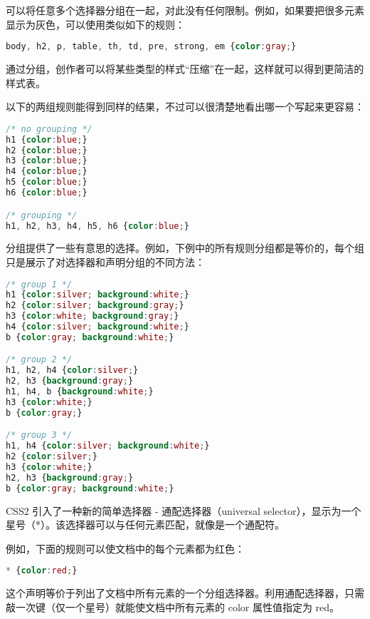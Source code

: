 可以将任意多个选择器分组在一起，对此没有任何限制。例如，如果要把很多元素显示为灰色，可以使用类似如下的规则：

\begin{lstlisting}[language=CSS]
body, h2, p, table, th, td, pre, strong, em {color:gray;}
\end{lstlisting}



通过分组，创作者可以将某些类型的样式“压缩”在一起，这样就可以得到更简洁的样式表。


以下的两组规则能得到同样的结果，不过可以很清楚地看出哪一个写起来更容易：


\begin{lstlisting}[language=CSS]
/* no grouping */
h1 {color:blue;}
h2 {color:blue;}
h3 {color:blue;}
h4 {color:blue;}
h5 {color:blue;}
h6 {color:blue;}

/* grouping */
h1, h2, h3, h4, h5, h6 {color:blue;}
\end{lstlisting}




分组提供了一些有意思的选择。例如，下例中的所有规则分组都是等价的，每个组只是展示了对选择器和声明分组的不同方法：


\begin{lstlisting}[language=CSS]
/* group 1 */
h1 {color:silver; background:white;}
h2 {color:silver; background:gray;}
h3 {color:white; background:gray;}
h4 {color:silver; background:white;}
b {color:gray; background:white;}

/* group 2 */
h1, h2, h4 {color:silver;}
h2, h3 {background:gray;}
h1, h4, b {background:white;}
h3 {color:white;}
b {color:gray;}

/* group 3 */
h1, h4 {color:silver; background:white;}
h2 {color:silver;}
h3 {color:white;}
h2, h3 {background:gray;}
b {color:gray; background:white;}
\end{lstlisting}


CSS2 引入了一种新的简单选择器 - 通配选择器（universal selector），显示为一个星号（*）。该选择器可以与任何元素匹配，就像是一个通配符。

例如，下面的规则可以使文档中的每个元素都为红色：

\begin{lstlisting}[language=CSS]
* {color:red;}
\end{lstlisting}




这个声明等价于列出了文档中所有元素的一个分组选择器。利用通配选择器，只需敲一次键（仅一个星号）就能使文档中所有元素的 color 属性值指定为 red。


